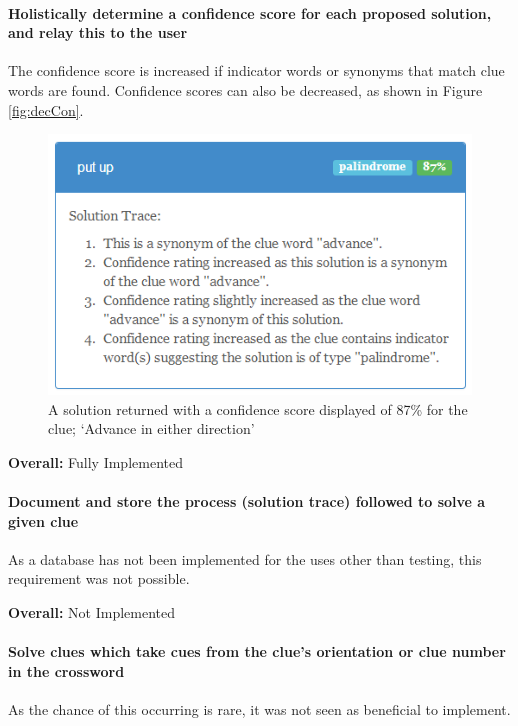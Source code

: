\paragraph{Holistically determine a confidence score for each proposed
solution, and relay this to the user}

The confidence score is increased if indicator words or synonyms that match clue
words are found. Confidence scores can also be decreased, as shown in Figure
\ref{fig:decCon}.

\begin{figure}[H]
	\centering
	\includegraphics[keepaspectratio=true]{evidence/confidence.png}
	\caption{A solution returned with a confidence score displayed of 87\% for the
	clue; `Advance in either direction'}
\end{figure}

{\bf Overall:} Fully Implemented


\paragraph{Document and store the process (solution trace) followed to solve a
given clue}

As a database has not been implemented for the uses other than testing, this
requirement was not possible.

{\bf Overall:} Not Implemented


\paragraph{Solve clues which take cues from the clue's orientation or clue
number in the crossword}

As the chance of this occurring is rare, it was not seen as beneficial to
implement.

